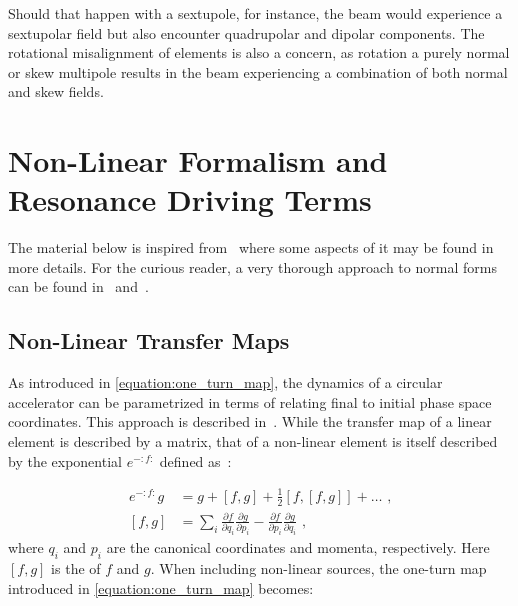 Should that happen with a sextupole, for instance, the beam would experience a sextupolar field but also encounter quadrupolar and dipolar components.
The rotational misalignment of elements is also a concern, as rotation a purely normal or skew multipole results in the beam experiencing a combination of both normal and skew fields.

\section{Non-Linear Formalism and Resonance Driving Terms}
\label{section:non_linear_formalism_and_rdts}

The material below is inspired from~\cite{PHD:Tomas, PHD:Franchi,PHD:Maclean, PHD:Persson} where some aspects of it may be found in more details.
For the curious reader, a very thorough approach to normal forms can be found in~\cite{PHD:Carlier} and~\cite{PRAB:Franchi:First_Simultaneous}.

\subsection{Non-Linear Transfer Maps}
\label{subsection:non_linear_transfer_maps}

As introduced in \cref{equation:one_turn_map}, the dynamics of a circular accelerator can be parametrized in terms of  relating final to initial phase space coordinates.
This approach is described in~\cite{BOOK:Bazzani:Normal_Form_Approach_Betatron_Motion, JMP:Forest:Hamiltonian_Free_Description_Single_Particle_Dynamics}.
While the transfer map of a linear element is described by a matrix, that of a non-linear element is itself described by the exponential  \(e^{-:f:}\) defined as~\cite{BOOK:Wolski:Beam_dynamics}:

\begin{equation}
    \begin{aligned}
        e^{-:f:} g          &= g + \left[f, g\right] + \frac{1}{2} \left[f, \left[f, g \right] \right] + \ldots \text{ ,} \\
        \left[ f, g \right] &= \sum_i \frac{\partial f}{\partial q_i} \frac{\partial g}{\partial p_i} - \frac{\partial f}{\partial p_i} \frac{\partial g}{\partial q_i} \text{ ,}
    \end{aligned}
    \label{equation:lie_operator}
\end{equation}
where \(q_i\) and \(p_i\) are the canonical coordinates and momenta, respectively.
Here \(\left[ f, g \right]\) is the  of \(f\) and \(g\).
When including non-linear sources, the one-turn map introduced in \cref{equation:one_turn_map} becomes:

